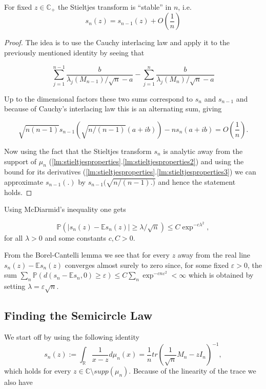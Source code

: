 \begin{lemma}
	For fixed $z\in\mathbb C_+$ the Stieltjes transform is ``stable'' in $n$, i.e.
	\begin{equation*}
		s_n(z)=s_{n-1}(z)+O\left(\frac{1}{n}\right)
	\end{equation*}
\end{lemma}
\begin{proof}
	The idea is to use the Cauchy interlacing law and apply it to the previously mentioned identity by seeing that
	
	$$\sum_{j=1}^{n-1}\frac{b}{\lambda_j(M_{n-1})/\sqrt{n}-a}-\sum_{j=1}^n\frac{b}{\lambda_j(M_n)/\sqrt{n}-a}$$
	
	Up to the dimensional factors these two sums correspond to $s_n$ and $s_{n-1}$ and because of Cauchy's interlacing law this is an alternating sum, giving
	
	$$\sqrt{n(n-1)}s_{n-1}(\sqrt{n/(n-1)}(a+ib))-ns_n(a+ib)=O\left(\frac{1}{n}\right).$$
	
	Now using the fact that the Stieltjes transform $s_n$ is analytic away from the support of $\mu_n$ (\ref{lm:stieltjesproperties}.\ref{lm:stieltjesproperties2}) and using the bound for its derivatives (\ref{lm:stieltjesproperties}.\ref{lm:stieltjesproperties3}) we can approximate $s_{n-1}(.)$ by $s_{n-1}(\sqrt{n/(n-1) . )}$ and hence the statement holds.
\end{proof}

Using McDiarmid's inequality one gets 

\begin{equation}\label{eq:concentrationOfStieltjesTransform}
	\mathbb P(|s_n(z)-\mathbb Es_n(z)|\geq\lambda/\sqrt n)\leq C\exp^{-c\lambda^2},
\end{equation}
 for all $\lambda>0$ and some constants $c,C>0$.

From the Borel-Cantelli lemma we see that for every $z$ away from the real line $s_n(z)-\mathbb Es_n(z)$ converges almost surely to zero since, for some fixed $\varepsilon>0$, the sum $\sum_n \mathbb P(d(s_n-\mathbb Es_n,0)\geq\varepsilon) \leq C\sum_n\exp^{-cn\varepsilon^2}<\infty$ which is obtained by setting $\lambda=\varepsilon\sqrt n$.

\subsection{Finding the Semicircle Law}

We start off by using the following identity $$s_n(z) := \int_\mathbb{R}\frac{1}{x-z}d\mu_n(x) = \frac{1}{n}tr\left(\frac{1}{\sqrt n}M_n-zI_n\right)^{-1},$$ which holds for every $z\in\mathbb C\setminus supp(\mu_n)$. Because of the linearity of the trace we also have


